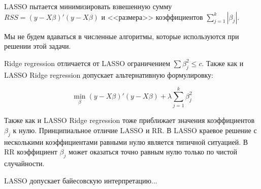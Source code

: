 \documentclass[pdftex,12pt,a4paper]{article}
\begin{document}
LASSO пытается минимизировать взвешенную сумму $RSS=(y-X\beta)'(y-X\beta)$ и <<размера>> коэффициентов $\sum_{j=1}^{k}|\beta_j|$.


Мы не будем вдаваться в численные алгоритмы, которые используются при решении этой задачи.


Ridge regression отличается от LASSO ограничением $\sum \beta_j^2\leq c$. 
Также как и LASSO Ridge regression допускает альтернативную формулировку:

\begin{equation}
\min_{\beta} (y-X\beta)'(y-X\beta)+\lambda \sum_{j=1}^{k} \beta_j^2
\end{equation}

Также как и LASSO Ridge regression тоже приближает значения коэффициентов $\beta_j$ к нулю. 
Принципиальное отличие LASSO и RR. 
В LASSO краевое решение с несколькими коэффициентами равными нулю является типичной ситуацией. 
В RR коэффициент $\beta_j$ может оказаться точно равным нулю только по чистой случайности. 


LASSO допускает байесовскую интерпретацию...
\end{document}
